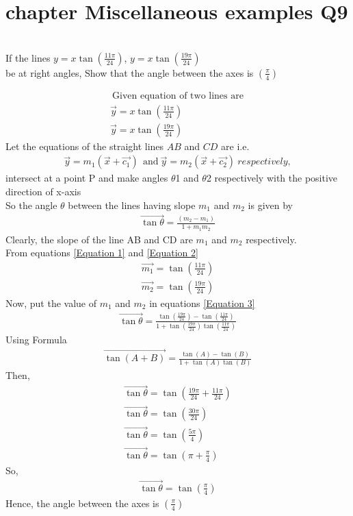 \documentclass[journal,12pt,twocolumn]{IEEEtran}
\begin{document}
\section{ chapter   Miscellaneous examples  Q9}
\item \\If the lines 
$y=x \tan (\frac{11\pi}{24})$,  $y=x \tan (\frac{19\pi}{24})$ \\be at right angles, Show that the angle between the axes is $(\frac{\pi}{4})$ 

\solution
\begin{align}
    ~\text{Given equation of two lines are}~\\ 
    \label{Equation 1}
    \vec{y} = x \tan (\frac{11\pi}{24})\\
    \label{Equation 2}
    \vec{y} = x \tan (\frac{19\pi}{24})
\end{align}
Let the equations of the straight lines $AB$ and $CD$ are i.e.
\begin{align}
    \vec{y} = m_1 ( \vec{x} + \vec{c_1} )\ ~\text{and}~
    \vec{y} = m_2 ( \vec{x} + \vec{c_2} )\
{respectively,}
\end{align}
intersect at a point P and make angles $\theta$1 and $\theta$2 respectively with the positive direction of x-axis\\
So the angle $\theta$ between the lines having slope $m_1$ and $m_2$ is given by
\begin{align}
\label{Equation 3}
\vec{\tan\theta} = \frac{(m_2 - m_1)}{1 + m_1m_2}
\end{align}
Clearly, the slope of the line AB and CD are $m_1$ and $m_2$ respectively.\\
From equations  
    \eqref{Equation 1} and \eqref{Equation 2}
\begin{align}
    \vec{m_1} =  \tan (\frac{11\pi}{24})\\
    \vec{m_2} =  \tan (\frac{19\pi}{24})
\end{align}
Now, put the value of $m_1$ and $m_2$ in equations  
    \eqref{Equation 3}
\begin{align}
 \vec{\tan\theta} = \frac{\tan (\frac{19\pi}{24}) -\tan (\frac{11\pi}{24})}{1 + \tan (\frac{19\pi}{24})\tan (\frac{11\pi}{24})}
\end{align}
Using Formula 
\begin{align}
 \vec{\tan(A+B)} = \frac{\tan (A) -\tan (B)}{1 + \tan (A)\tan (B)}
\end{align}
Then,
\begin{align}
 \vec{\tan\theta} = {\tan (\frac{19\pi}{24}+\frac{11\pi}{24})}\\
 \vec{\tan\theta} = {\tan (\frac{30\pi}{24})}\\
 \vec{\tan\theta} = {\tan (\frac{5\pi}{4})}\\
 \vec{\tan\theta} = {\tan ({\pi}+\frac{\pi}{4})}
 \end{align}
 So,
 \begin{align}
 \vec{\tan\theta} = {\tan (\frac{\pi}{4})}
\end{align}
Hence, the angle between the axes is $(\frac{\pi}{4})$
\end{document}
